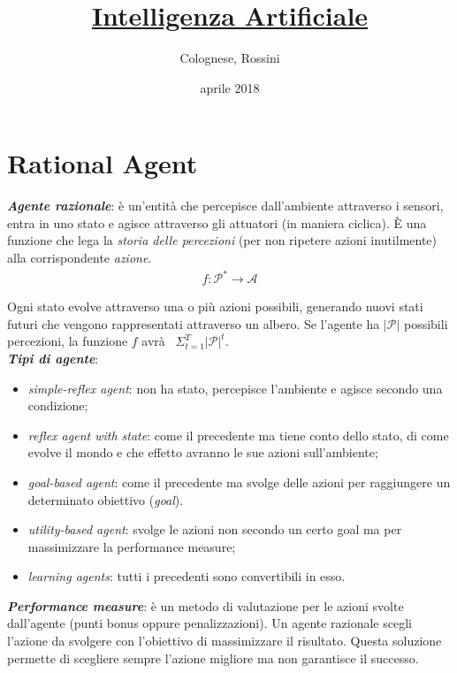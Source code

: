 \documentclass[a4paper, notitlepage, 9pt]{extreport}
\makeatletter
\newcommand*{\toccontents}{\@starttoc{toc}}
\makeatother
\begin{document}
	\title{\textbf{\underline{Intelligenza Artificiale}}}
	\date{aprile 2018}
	\author{Colognese, Rossini}
	\maketitle
	
	\toccontents

\chapter*{Rational Agent}
\textit{\textbf{Agente razionale}}: è un'entità che percepisce dall'ambiente attraverso i sensori, entra in uno stato e agisce attraverso gli attuatori (in maniera ciclica). È una funzione che lega la \textit{storia delle percezioni} (per non ripetere azioni inutilmente) alla corrispondente \textit{azione}.
\begin{align*}
f: \mathcal{P}^* \rightarrow \mathcal{A}
\end{align*}

\noindent
Ogni stato evolve attraverso una o più azioni possibili, generando nuovi stati futuri che vengono rappresentati attraverso un albero. Se l'agente ha $|\mathcal{P}|$ possibili percezioni, la funzione $f$ avrà~ $\Sigma_{t=1}^T |\mathcal{P}|^t$.\\
\textbf{\textit{Tipi di agente}}:
\begin{itemize}
	\item \textit{simple-reflex agent}: non ha stato, percepisce l'ambiente e agisce secondo una condizione;
	\item \textit{reflex agent with state}: come il precedente ma tiene conto dello stato, di come evolve il mondo e che effetto avranno le sue azioni sull'ambiente;
	\item \textit{goal-based agent}: come il precedente ma svolge delle azioni per raggiungere un determinato obiettivo (\textit{goal}).
	\item \textit{utility-based agent}: svolge le azioni non secondo un certo goal ma per massimizzare la performance measure;
	\item \textit{learning agents}: tutti i precedenti sono convertibili in esso.
\end{itemize}

\noindent
\textit{\textbf{Performance measure}}: è un metodo di valutazione per le azioni svolte dall'agente (punti bonus oppure penalizzazioni). Un agente razionale scegli l'azione da svolgere con l'obiettivo di massimizzare il risultato. Questa soluzione permette di scegliere sempre l'azione migliore ma non garantisce il successo.
\newline
\end{document}
